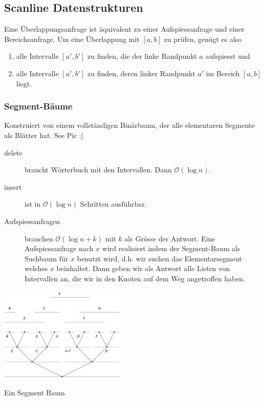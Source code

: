 \documentclass[a4paper, 9pt, DIV=20]{scrartcl}
\newcommand{\Oh}{\mathcal{O}}
\begin{document}
\subsection{Scanline Datenstrukturen}

Eine Überlappungsanfrage ist äquivalent zu einer Aufspiessanfrage und einer Bereichsanfrage. Um eine Überlappung mit $[a,b]$ zu prüfen, genügt es also
\begin{enumerate}
\item alle Intervalle $[a',b']$ zu finden, die der linke Randpunkt $a$ aufspiesst und
\item alle Intervalle $[a',b']$ zu finden, deren linker Randpunkt $a'$ im Bereich $[a,b]$ liegt.
\end{enumerate}

\subsubsection{Segment-Bäume}
Konstruiert von einem vollständigen Binärbaum, der alle elementaren Segmente als Blätter hat. See Pic :]

\begin{description}
\item[delete] braucht Wörterbuch mit den Intervallen. Dann $\Oh(\log{n})$.
\item[insert]ist in $\Oh(\log{n})$ Schritten ausführbar.
\item[Aufspiessanfragen]brauchen $\Oh(\log{n}+k)$ mit $k$ als Grösse der Antwort. Eine Aufspiessanfrage nach $x$ wird realisiert indem der Segment-Baum als Suchbaum für $x$ benutzt wird, d.h. wir suchen das Elementarsegment welches $x$ beinhaltet. Dann geben wir als Antwort alle Listen von Intervallen an, die wir in den Knoten auf dem Weg angetroffen haben.
\end{description}

\begin{center}
\includegraphics[width=6cm]{SegmentBaum}

Ein Segment Baum
\end{center}
\end{document}
